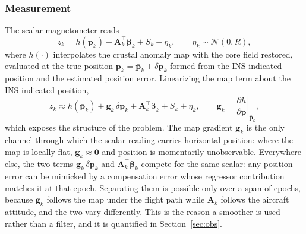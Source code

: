 \documentclass{IEEEtaes}
\begin{document}
\subsubsection{Measurement}
The scalar magnetometer reads
\begin{equation}
z_k=h(\mathbf{p}_k)+\mathbf{A}_k^{\top}\boldsymbol{\beta}_k+S_k+\eta_k,
\qquad \eta_k\sim\mathcal{N}(0,R),
\label{eq:meas}
\end{equation}
where $h(\cdot)$ interpolates the crustal anomaly map with the core field
restored, evaluated at the true position
$\mathbf{p}_k=\bar{\mathbf{p}}_k+\delta\mathbf{p}_k$ formed from the
INS-indicated position and the estimated position error. Linearizing the map
term about the INS-indicated position,
\begin{equation}
z_k\approx h(\bar{\mathbf{p}}_k)+\mathbf{g}_k^{\top}\delta\mathbf{p}_k
+\mathbf{A}_k^{\top}\boldsymbol{\beta}_k+S_k+\eta_k,
\qquad
\mathbf{g}_k=\left.\frac{\partial h}{\partial\mathbf{p}}\right|_{\bar{\mathbf{p}}_k},
\label{eq:measlin}
\end{equation}
which exposes the structure of the problem. The map gradient $\mathbf{g}_k$ is
the only channel through which the scalar reading carries horizontal position:
where the map is locally flat, $\mathbf{g}_k\!\approx\!\mathbf{0}$ and position
is momentarily unobservable. Everywhere else, the two terms
$\mathbf{g}_k^{\top}\delta\mathbf{p}_k$ and
$\mathbf{A}_k^{\top}\boldsymbol{\beta}_k$ compete for the same scalar: any
position error can be mimicked by a compensation error whose regressor
contribution matches it at that epoch. Separating them is possible only over a
span of epochs, because $\mathbf{g}_k$ follows the map under the flight path
while $\mathbf{A}_k$ follows the aircraft attitude, and the two vary
differently. This is the reason a smoother is used rather than a filter, and it
is quantified in Section~\ref{sec:obs}.
\end{document}
